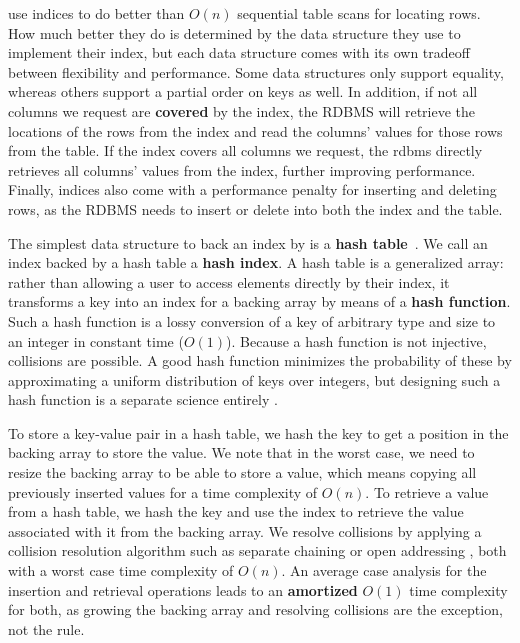  use indices to do better than \(O(n)\) sequential table scans for locating rows.
How much better they do is determined by the data structure they use to implement their index, but each data structure comes with its own tradeoff between flexibility and performance.
Some data structures only support equality, whereas others support a partial order on keys as well.
In addition, if not all columns we request are \textbf{covered} by the index, the RDBMS will retrieve the locations of the rows from the index and read the columns' values for those rows from the table.
If the index covers all columns we request, the \acrshort{rdbms} directly retrieves all columns' values from the index, further improving performance.
Finally, indices also come with a performance penalty for inserting and deleting rows, as the RDBMS needs to insert or delete into both the index and the table.

The simplest data structure to back an index by is a \textbf{hash table}~\cite{DBLP:books/daglib/0023376}.
We call an index backed by a hash table a \textbf{hash index}.
A hash table is a generalized array\thinspace: rather than allowing a user to access elements directly by their index, it transforms a key into an index for a backing array by means of a \textbf{hash function}.
Such a hash function is a lossy conversion of a key of arbitrary type and size to an integer in constant time (\(O(1)\)).
Because a hash function is not injective, collisions are possible.
A good hash function minimizes the probability of these by approximating a uniform distribution of keys over integers, but designing such a hash function is a separate science entirely \cite{DBLP:books/daglib/0023376}.

To store a key-value pair in a hash table, we hash the key to get a position in the backing array to store the value.
We note that in the worst case, we need to resize the backing array to be able to store a value, which means copying all previously inserted values for a time complexity of \(O(n)\).
To retrieve a value from a hash table, we hash the key and use the index to retrieve the value associated with it from the backing array.
We resolve collisions by applying a collision resolution algorithm such as separate chaining or open addressing \cite{DBLP:books/daglib/0023376}, both with a worst case time complexity of \(O(n)\).
An average case analysis for the insertion and retrieval operations leads to an \textbf{amortized} \(O(1)\) time complexity for both, as growing the backing array and resolving collisions are the exception, not the rule.

